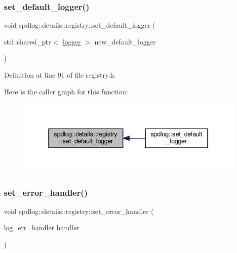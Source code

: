 \subsubsection{\texorpdfstring{set\+\_\+default\+\_\+logger()}{set\_default\_logger()}}
{\footnotesize\ttfamily void spdlog\+::details\+::registry\+::set\+\_\+default\+\_\+logger (\begin{DoxyParamCaption}\item[{std\+::shared\+\_\+ptr$<$ \hyperlink{classspdlog_1_1logger}{logger} $>$}]{new\+\_\+default\+\_\+logger }\end{DoxyParamCaption})\hspace{0.3cm}{\ttfamily [inline]}}



Definition at line 91 of file registry.\+h.

Here is the caller graph for this function\+:
\nopagebreak
\begin{figure}[H]
\begin{center}
\leavevmode
\includegraphics[width=333pt]{classspdlog_1_1details_1_1registry_ae2a45628046a1d0cd3f8de81a5556acb_icgraph}
\end{center}
\end{figure}
\mbox{\label{classspdlog_1_1details_1_1registry_a47543b9b7ebe0dc3664cfd5f3e385905}} 
\subsubsection{\texorpdfstring{set\+\_\+error\+\_\+handler()}{set\_error\_handler()}}
{\footnotesize\ttfamily void spdlog\+::details\+::registry\+::set\+\_\+error\+\_\+handler (\begin{DoxyParamCaption}\item[{\hyperlink{namespacespdlog_ad3ed787a29f245c833ef66faf48036e2}{log\+\_\+err\+\_\+handler}}]{handler }\end{DoxyParamCaption})\hspace{0.3cm}{\ttfamily [inline]}}



